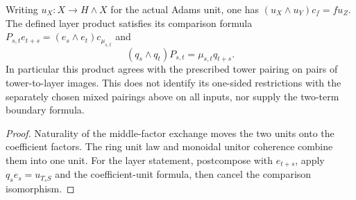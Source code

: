 \begin{proposition}
  \label{prop:h6-coefficient-layer-product-unit}
  \leanok
  Writing $u_X:X\to H\wedge X$ for the actual Adams unit, one has
  $(u_X\wedge u_Y)c_f=fu_Z$. The defined layer product satisfies its
  comparison formula $P_{s,t}e_{t+s}=(e_s\wedge e_t)c_{\mu_{s,t}}$ and
  \[
    (q_s\wedge q_t)P_{s,t}=\mu_{s,t}q_{t+s}.
  \]
  In particular this product agrees with the prescribed tower pairing on
  pairs of tower-to-layer images. This does not identify its one-sided
  restrictions with the separately chosen mixed pairings above on all
  inputs, nor supply the two-term boundary formula.
\end{proposition}
\begin{proof}
  Naturality of the middle-factor exchange moves the two units onto the
  coefficient factors. The ring unit law and monoidal unitor coherence
  combine them into one unit. For the layer statement, postcompose with
  $e_{t+s}$, apply $q_se_s=u_{T_sS}$ and the coefficient-unit formula,
  then cancel the comparison isomorphism.
  \leanok
\end{proof}

